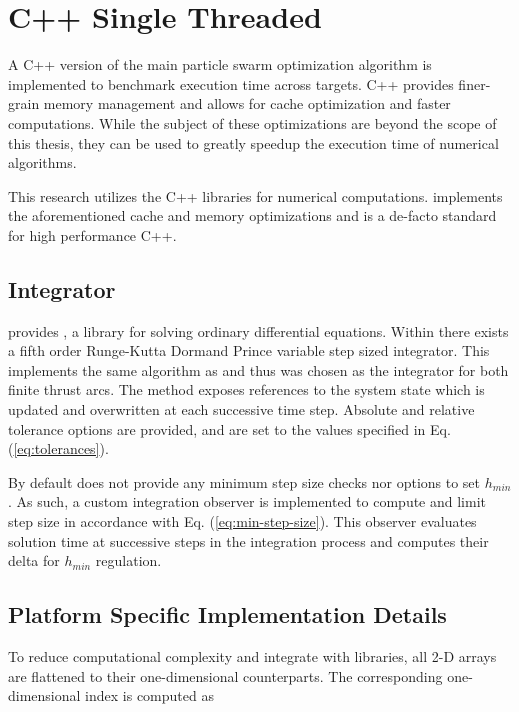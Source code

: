 \section{C++ Single Threaded}

\noindent A C++ version of the main particle swarm optimization algorithm is implemented to benchmark execution time across targets.
C++ provides finer-grain memory management and allows for cache optimization and faster computations.
While the subject of these optimizations are beyond the scope of this thesis, they can be used to greatly speedup the execution time
of numerical algorithms. \newline

\noindent This research utilizes the C++  libraries for numerical computations.
 implements the aforementioned cache and memory optimizations and is a de-facto standard
for high performance C++.

\subsection{Integrator}

\noindent {} provides , a library for solving ordinary differential equations. Within 
there exists a fifth order Runge-Kutta Dormand Prince variable
step sized integrator. This implements the same algorithm as  and thus was chosen as the integrator for both finite
thrust arcs. The method exposes references to the system state which is updated and overwritten at each successive time step. Absolute
and relative tolerance options are provided, and are set to the values specified in Eq. (\ref{eq:tolerances}). \newline

\noindent By default  does not provide any minimum step size checks nor options to set $h_{min}$.
As such, a custom integration observer is implemented to compute and limit step size in accordance with Eq. (\ref{eq:min-step-size}). 
This observer evaluates solution time at successive steps in the integration process and computes their delta for 
$h_{min}$ regulation.

\subsection{Platform Specific Implementation Details}

\noindent To reduce computational complexity and integrate with  libraries, all 2-D arrays
are flattened to their one-dimensional counterparts. The corresponding one-dimensional index is computed as

